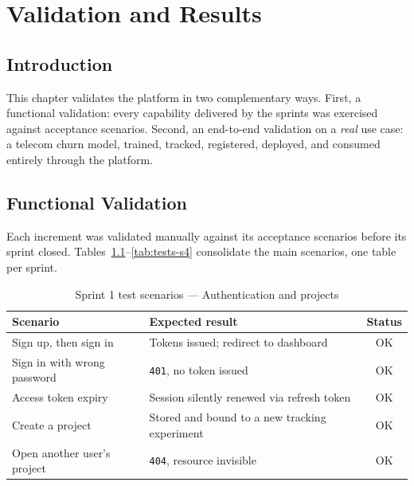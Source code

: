 \chapter{Validation and Results}
\label{chap:validation}

\section{Introduction}
This chapter validates the platform in two complementary ways. First, a
functional validation: every capability delivered by the sprints was exercised
against acceptance scenarios. Second, an end-to-end validation on a
\emph{real} use case: a telecom churn model, trained, tracked, registered,
deployed, and consumed entirely through the platform.

\section{Functional Validation}
\label{sec:functional-validation}
Each increment was validated manually against its acceptance scenarios before
its sprint closed. Tables~\ref{tab:tests-s1}--\ref{tab:tests-s4} consolidate the
main scenarios, one table per sprint.

\begin{table}[H]\centering
\renewcommand{\arraystretch}{1.15}
\caption{Sprint 1 test scenarios --- Authentication and projects}\label{tab:tests-s1}
\small
\begin{tabularx}{\textwidth}{|X|X|c|}
\hline
\rowcolor{primary!15}
\textbf{Scenario} & \textbf{Expected result} & \textbf{Status}\\
\hline
Sign up, then sign in & Tokens issued; redirect to dashboard & OK\\ \hline
Sign in with wrong password & \texttt{401}, no token issued & OK\\ \hline
Access token expiry & Session silently renewed via refresh token & OK\\ \hline
Create a project & Stored and bound to a new tracking experiment & OK\\ \hline
Open another user's project & \texttt{404}, resource invisible & OK\\ \hline
\end{tabularx}
\end{table}


